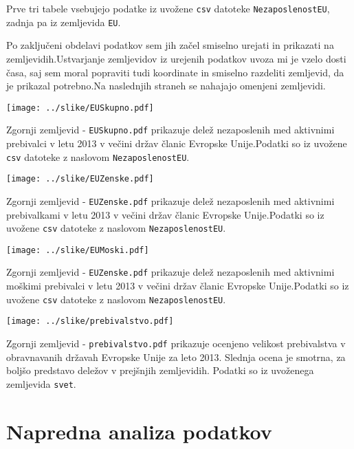 \documentclass[11pt,a4paper]{article}
\begin{document}
Prve tri tabele vsebujejo podatke iz uvožene \verb|csv| datoteke \verb|NezaposlenostEU|, zadnja pa iz zemljevida \verb|EU|. 

Po zaključeni obdelavi podatkov sem jih začel smiselno urejati in prikazati na zemljevidih.Ustvarjanje zemljevidov iz urejenih podatkov uvoza mi je vzelo dosti časa, saj sem moral popraviti tudi koordinate in smiselno razdeliti zemljevid, da je prikazal potrebno.Na naslednjih straneh se nahajajo omenjeni zemljevidi. 

\texttt{[image: ../slike/EUSkupno.pdf]}

Zgornji zemljevid - \verb|EUSkupno.pdf| prikazuje delež nezaposlenih med aktivnimi prebivalci v letu 2013 v večini držav članic Evropske Unije.Podatki so iz uvožene \verb|csv| datoteke z naslovom \verb|NezaposlenostEU|. 

\texttt{[image: ../slike/EUZenske.pdf]}

Zgornji zemljevid - \verb|EUZenske.pdf| prikazuje delež nezaposlenih med aktivnimi prebivalkami v letu 2013 v večini držav članic Evropske Unije.Podatki so iz uvožene \verb|csv| datoteke z naslovom \verb|NezaposlenostEU|. 

\texttt{[image: ../slike/EUMoski.pdf]}

Zgornji zemljevid - \verb|EUZenske.pdf| prikazuje delež nezaposlenih med aktivnimi moškimi prebivalci v letu 2013 v večini držav članic Evropske Unije.Podatki so iz uvožene \verb|csv| datoteke z naslovom \verb|NezaposlenostEU|. 

\texttt{[image: ../slike/prebivalstvo.pdf]}

Zgornji zemljevid - \verb|prebivalstvo.pdf| prikazuje ocenjeno velikost prebivalstva v obravnavanih državah Evropske Unije za leto 2013. Slednja ocena je smotrna, za boljšo predstavo deležov v prejšnjih zemljevidih. Podatki so iz uvoženega zemljevida \verb|svet|. 

\pagebreak
\section{Napredna analiza podatkov}
\end{document}
